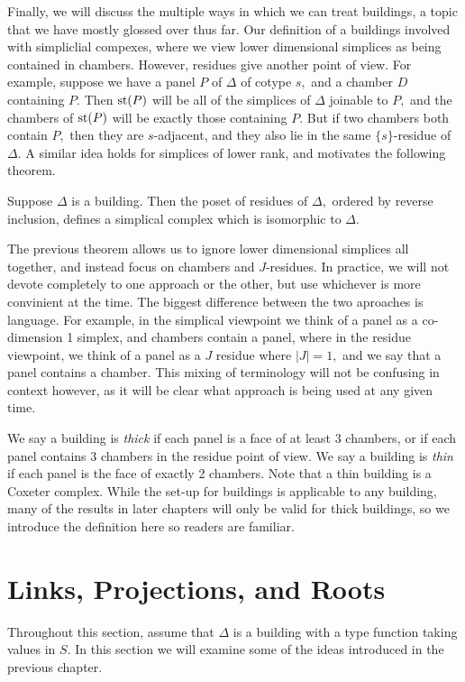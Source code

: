 \documentclass[class=book, crop=false,12 pt]{standalone}
\begin{document}
Finally, we will discuss the multiple ways in which we can treat buildings, a topic that we have mostly glossed over thus far. Our definition of a buildings involved with simpliclial compexes, where we view lower dimensional simplices as being contained in chambers. However, residues give another point of view. For example, suppose we have a panel $P$ of $\Delta$ of cotype $s,$ and a chamber $D$ containing $P.$ Then $\mathrm{st}(P)$ will be all of the simplices of $\Delta$ joinable to $P,$ and the chambers of $\mathrm{st}(P)$ will be exactly those containing $P.$ But if two chambers both contain $P,$ then they are $s$-adjacent, and they also lie in the same $\{s\}$-residue of $\Delta.$ A similar idea holds for simplices of lower rank, and motivates the following theorem.
\begin{theorem}
	\label{thm:sim-cham}
	Suppose $\Delta$ is a building. Then the poset of residues of $\Delta,$ ordered by reverse inclusion, defines a simplical complex which is isomorphic to $\Delta.$
\end{theorem}
The previous theorem allows us to ignore lower dimensional simplices all together, and instead focus on chambers and $J$-residues. In practice, we will not devote completely to one approach or the other, but use whichever is more convinient at the time. The biggest difference between the two aproaches is language. For example, in the simplical viewpoint we think of a panel as a co-dimension 1 simplex, and chambers contain a panel, where in the residue viewpoint, we think of a panel as a $J$ residue where $|J|=1,$ and we say that a panel contains a chamber. This mixing of terminology will not be confusing in context however, as it will be clear what approach is being used at any given time.

We say a building is \emph{thick} if each panel is a face of at least 3 chambers, or if each panel contains 3 chambers in the residue point of view. We say a building is \emph{thin} if each panel is the face of exactly 2 chambers. Note that a thin building is a Coxeter complex. While the set-up for buildings is applicable to any building, many of the results in later chapters will only be valid for thick buildings, so we introduce the definition here so readers are familiar.


\section{Links, Projections, and Roots}
Throughout this section, assume that $\Delta$ is a building with a type function taking values in $S.$ In this section we will examine some of the ideas introduced in the previous chapter.
\end{document}
